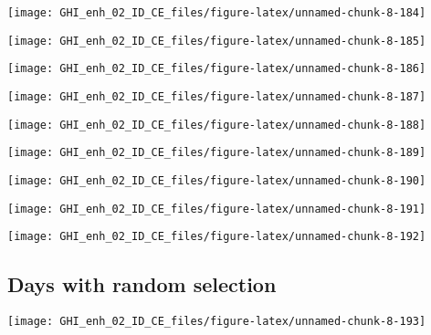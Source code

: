 \documentclass[
  10pt,
  a4paper,oneside]{article}
\begin{document}
\begin{center}\texttt{[image: GHI\_enh\_02\_ID\_CE\_files/figure-latex/unnamed-chunk-8-184]} \end{center}

\begin{center}\texttt{[image: GHI\_enh\_02\_ID\_CE\_files/figure-latex/unnamed-chunk-8-185]} \end{center}

\begin{center}\texttt{[image: GHI\_enh\_02\_ID\_CE\_files/figure-latex/unnamed-chunk-8-186]} \end{center}

\begin{center}\texttt{[image: GHI\_enh\_02\_ID\_CE\_files/figure-latex/unnamed-chunk-8-187]} \end{center}

\begin{center}\texttt{[image: GHI\_enh\_02\_ID\_CE\_files/figure-latex/unnamed-chunk-8-188]} \end{center}

\begin{center}\texttt{[image: GHI\_enh\_02\_ID\_CE\_files/figure-latex/unnamed-chunk-8-189]} \end{center}

\begin{center}\texttt{[image: GHI\_enh\_02\_ID\_CE\_files/figure-latex/unnamed-chunk-8-190]} \end{center}

\begin{center}\texttt{[image: GHI\_enh\_02\_ID\_CE\_files/figure-latex/unnamed-chunk-8-191]} \end{center}

\begin{center}\texttt{[image: GHI\_enh\_02\_ID\_CE\_files/figure-latex/unnamed-chunk-8-192]} \end{center}

\FloatBarrier

\hypertarget{days-with-random-selection}{%
\subsection{Days with random selection}\label{days-with-random-selection}}

\begin{center}\texttt{[image: GHI\_enh\_02\_ID\_CE\_files/figure-latex/unnamed-chunk-8-193]} \end{center}
\end{document}
